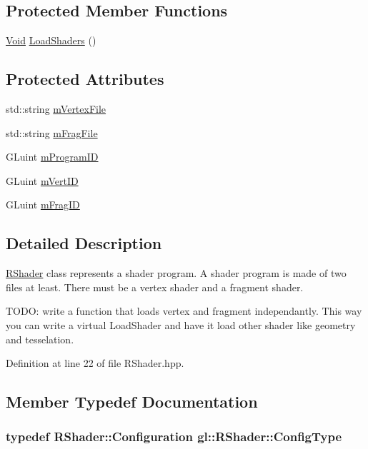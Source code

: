 \subsection*{Protected Member Functions}
\begin{DoxyCompactItemize}
\item 
\hyperlink{_basic_types_8hpp_afdf0f22c576e6ee1b982f64b839c4bea}{Void} \hyperlink{classgl_1_1_r_shader_a2935e72e2bb4b93b61af39c998000b4c}{Load\-Shaders} ()
\end{DoxyCompactItemize}
\subsection*{Protected Attributes}
\begin{DoxyCompactItemize}
\item 
std\-::string \hyperlink{classgl_1_1_r_shader_a2285ac811c39bd59866a0239e04932b2}{m\-Vertex\-File}
\item 
std\-::string \hyperlink{classgl_1_1_r_shader_a6ce293498749d93a4fbc991b17a4cf70}{m\-Frag\-File}
\item 
G\-Luint \hyperlink{classgl_1_1_r_shader_a61ad380e879e29f8c052cad73158c54e}{m\-Program\-I\-D}
\item 
G\-Luint \hyperlink{classgl_1_1_r_shader_ab0996603afd00f5ce3a6b20479103083}{m\-Vert\-I\-D}
\item 
G\-Luint \hyperlink{classgl_1_1_r_shader_a0e077d5a150093c7af3c9ce047fcbe8d}{m\-Frag\-I\-D}
\end{DoxyCompactItemize}


\subsection{Detailed Description}
\hyperlink{classgl_1_1_r_shader}{R\-Shader} class represents a shader program. A shader program is made of two files at least. There must be a vertex shader and a fragment shader.

T\-O\-D\-O\-: write a function that loads vertex and fragment independantly. This way you can write a virtual Load\-Shader and have it load other shader like geometry and tesselation. 

Definition at line 22 of file R\-Shader.\-hpp.



\subsection{Member Typedef Documentation}
\hypertarget{classgl_1_1_r_shader_a737d7ce7dc0057760c6ff971aebdb3ff}{
\subsubsection[{Config\-Type}]{\setlength{\rightskip}{0pt plus 5cm}typedef {\bf R\-Shader\-::\-Configuration} {\bf gl\-::\-R\-Shader\-::\-Config\-Type}}}\label{classgl_1_1_r_shader_a737d7ce7dc0057760c6ff971aebdb3ff}


